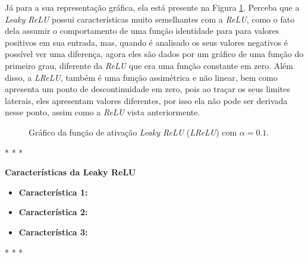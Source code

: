 Já para a sua representação gráfica, ela está presente na Figura \ref{fig:leaky-relu}. Perceba que a \textit{Leaky ReLU} possui características muito semelhantes com a \textit{ReLU}, como o fato dela assumir o comportamento de uma função identidade para para valores positivos em sua entrada, mas, quando é analisado os seus valores negativos é possível ver uma diferença, agora eles são dados por um gráfico de uma função do primeiro grau, diferente da \textit{ReLU} que era uma função constante em zero. Além disso, a \textit{LReLU}, também é uma função assimétrica e não linear, bem como apresenta um ponto de descontinuidade em zero, pois ao traçar os seus limites laterais, eles apresentam valores diferentes, por isso ela não pode ser derivada nesse ponto, assim como a \textit{ReLU} vista anteriormente.

\begin{figure}[h!]
    \centering
    \caption{Gráfico da função de ativação \textit{Leaky ReLU} (\textit{LReLU}) com $\alpha = 0.1$.}
    \label{fig:leaky-relu}
\end{figure}

\medskip
\begin{center}
 * * *
\end{center}
\medskip

\textbf{Características da Leaky ReLU}
\vspace{1em}

\begin{itemize}
    \item \textbf{Característica 1:}
    \item \textbf{Característica 2:}
    \item \textbf{Característica 3:}
\end{itemize}

\medskip
\begin{center}
 * * *
\end{center}
\medskip


